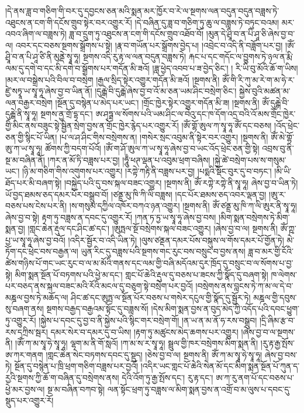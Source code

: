 །དེ་ནས་ཟླ་བ་གཅིག་གི་བར་དུ་དབྱངས་ཅན་མའི་སྨན་མར་ཁྱོར་བ་རེ་ལ་སྔགས་ལན་བདུན་བདུན་བཟླས་ཏེ་འཐུངས་ན་ངག་གི་དངོས་གྲུབ་སྟེར་བར་འགྱུར་རོ། །དེ་བཞིན་དུ་ཟླ་བ་གཅིག་ཏུ་ཆུ་ལ་བཟླས་ཏེ་བཏུང་བའམ། མར་འབའ་ཞིག་ལ་བཟླས་ཏེ། ཟླ་བ་དྲུག་ཏུ་འཐུངས་ན་ངག་གི་དངོས་གྲུབ་འཐོབ་བོ། །མུན་དེ་ཤྲཱི་བ་ན་པི་ཤཱ་ཅི་ཞེས་བྱ་བ་ལ། འབར་དང་བཅས་སྔགས་སྒྲོགས་པ་སྟེ། །རྣ་བ་གཡོན་པར་སྒྲོགས་བྱེད་པ། །འབྲེང་བ་འདི་ནི་བཟློག་པར་བྱ། །ཨོཾ་ཤྲཱི་བ་ན་པི་ཤཱ་ཙི་ནི་མུནྡེ་སྭཱ་ཧཱ། སྔགས་འདི་རུ་རྟ་ལ་ལན་བདུན་བཟླས་ཏེ། རྐང་པ་དང་གདོང་ལ་བྱུགས་ཏེ་ཉལ་ན་རྨི་ལམ་དུ་དགེ་བ་དང་མི་དགེ་བ་སྒྲོགས་པར་གདོན་མི་ཟའོ། །ཟླ་ཕྱེད་འབབ་པ་ཟ་བྱེད་ཅིང་། །
རི་ཡི་བུ་མོའི་ཆོ་ག་ཡིས། །མར་ལ་བསྒྲེས་པའི་བིལ་བ་བསྲེག །རྒྱལ་སྲིད་སྟེར་འགྱུར་གདོན་མི་ཟའོ། །སྔགས་ནི། ཨོཾ་གི་རི་ཀུ་མ་རེ་ག་མ་ཧེ་ར་ཛྱེ་སཏྭཱ་ཡ་སྭཱ་ཧཱ་ཞེས་བྱ་བ་ཡིན་ནོ། །དུརྒྒེ་བི་དུརྒྒེ་ཞེས་བྱ་བ་འོ་མ་ཅན་ཡམ་ཤིང་བསྲེག་ཅིང་། སྐྱེས་བུའི་མཚན་མ་ལན་བརྒྱར་བསྲེག །སྔོན་དུ་བསྙེན་པ་མེད་པར་ཡང་། །གྲོང་ཁྱེར་སྟེར་འགྱུར་གདོན་མི་ཟ། །སྔགས་ནི། ཨོཾ་དུརྒྒེ་བི་དུརྒྒེ་ནི་སྭཱ་ཧཱ། སྔགས་ནྱ་གྲོ་དྷ་དང་། ཨ་ཤྭཏྠ་ལ་སོགས་པའི་ཡམ་ཤིང་ལ་བེའུ་དང་ཁ་དོག་འདྲ་བའི་འོ་མས་གྲོང་ཁྱེར་གྱི་མིང་ནས་བཟུང་སྟེ་སྦྱིན་སྲེག་བྱས་ན་གྲོང་ཁྱེར་རྙེད་པར་འགྱུར་རོ། །ཨོཾ་གྷོ་ཨུལ་ཀ་སྭཱ་ཧཱ་ཨོཾ་དང་བཅས། །འོད་ཕྲེང་ཅན་གྱི་སྙིང་པོ་ཡིན། །པ་ལ་ཤ་ཤིང་གིས་བསྲེགས་ན། །གསེར་སྲང་འབུམ་ནི་སྟེར་བར་འགྱུར། །སྔགས་ནི། ཨོཾ་མེ་གྷོ་ཨུ་ཀ་ཡ་སྭཱ་ཧཱ། ཚོགས་ཀྱི་བདག་པོའོ། །ཨོཾ་ག་ཤོ་ཨུལ་ཀ་ཡ་སྭཱ་ཧཱ་ཞེས་བྱ་བ་ཡང་འོད་ཕྲེང་ཅན་གྱི་སྟེ། འབྲས་བུ་ནི་སྔ་མ་བཞིན་ནོ། །ཀར་ན་མོ་ཏི་བཟླས་པར་བྱ། །ཧཱུྃ་ཕཊ་ལྡན་པ་འབུམ་ཕྲག་བཞིས། །སྐྱེ་ཚེ་བསྲེག་པས་ས་གསུམ་ཡང་། །ཉི་མ་གཅིག་གིས་འགུགས་པར་འགྱུར། །རཀྟེ་ཀརྟི་ནི་བཟླས་པར་བྱ། །པདྨའི་སྡོང་བུར་དུ་བ་བཏང་། །མི་ཡི་ཐོད་པར་མི་བཞག་སྟེ། །བསྐྱེད་པའི་དུ་བས་སྐལ་བཟང་འགྱུར། །སྔགས་ནི། ཨོཾ་རཀྟེ་རཀྟེ་ནི་སྭཱ་ཧཱ། ཞེས་བྱ་བ་ཡིན་ཏེ། ཡོ་བྱད་ཐམས་ཅད་དམར་པོར་བསྒྲུབ་བོ། །ཙནྡྲ་མུ་ཁི་ཀི་ལི་བཟླས། །དང་པོར་ཐམས་ཅད་འབར་ལྡན་བྱ། །ཨུ་ར་བཅས་པས་ངེས་པར་ནི། །ས་གསུམ་དཀྱིལ་འཁོར་བཀའ་ཉན་འགྱུར། །སྔགས་ནི། ཨོཾ་ཙནྡྲ་མུ་ཁི་ཀ་ལི་ཨུར་ནི་སྭཱ་ཧཱ། ཞེས་བྱ་བ་སྟེ། རྟག་ཏུ་བཟླས་ན་དབང་དུ་འགྱུར་རོ། །ཀན་ཏ་ཏྱ་ཡ་སྭཱ་ཧཱ་ཞེས་བྱ་བས། །མིག་སྨན་བསྲེགས་ཏེ་མིག་སྨན་བྱ། །གླང་ཆེན་རྡུལ་དང་ཤིང་ཚ་དང་། །ཨུཏྤལ་སྔོ་བསྲེགས་སྐལ་བཟང་འགྱུར། །ཞེས་བྱ་བ་ལ། སྔགས་ནི། ཨོཾ་ཀྵ་པྱ་ཡ་སྭཱ་ཧཱ་ཞེས་བྱ་བའོ། །འདིར་སྦྱོར་བ་འདི་ཡིན་ཏེ། །ལུས་ཙནྡན་དམར་པོས་བསྐུས་ལ་གོས་དམར་པོ་གྱོན་ཏེ། མེ་ཏོག་དང་ཕྲེང་བས་བརྒྱན་ལ། ཡུན་རིང་དུ་བཟླས་པའི་སྔགས་གང་རུང་བས་བསྲུང་བ་བྱས་ནས། ཟླ་བ་མར་གྱི་ངོའི་ཚེས་གཉིས་པོ་གང་ཡང་རུང་བ་ལ་མ་མོའི་གནས་དང་ལམ་གྱི་བཞི་མདོའམ་དུར་ཁྲོད་དུ་བསྲུང་བ་ལ་སོགས་པ་བྱ་སྟེ། མིག་སྨན་སྔོན་པོ་བཏགས་པའི་ཕྱེ་མ་དང་། གླང་པོ་ཆེའི་རྡུལ་དུ་བཅས་པ་ཟངས་ཀྱི་སྣོད་དུ་བཞག་སྟེ། ཁ་ལེགས་པར་བཅད་ནས་སྐལ་བཟང་མའི་རོའི་མངལ་དུ་བཅུག་སྟེ་བསྲེག་པར་བྱའོ། །བསྲེགས་ནས་བླངས་ཏེ་ཀ་མ་ལ་དེ་བ་མཎྜལ་བྱས་ཏེ་མཆོད་ལ། ཤིང་ཚ་དང་ཨུཏྤ་ལ་སྔོན་པོར་བཅས་པ་གསེར་དངུལ་གྱི་སྣོད་དུ་སྦྱོར་ཏེ། མཎྜལ་གྱི་དབུས་སུ་བཞག་ནས། སྔགས་བརྒྱད་བརྒྱའམ་སྟོང་དུ་བཟླས་སོ། །དེས་མིག་སྨན་བྱས་ན་བུད་མེད་ཀྱི་འདོད་པའི་དབང་ཕྱུག་ཏུ་འགྱུར་རོ། །སྐྱེས་པ་དབང་དུ་བྱ་བ་ནི་སྐྱེས་པའི་སྙིང་གར་བསྲེག་གོ། །ན་ཡ་ན་མ་ནོ་ཧ་རས་བསྒྲུབ། །དྲི་ཞིམ་རྩ་བ་རས་དཀྲིས་སྦར། དམར་སེར་བ་དམར་དུ་བ་ཡིས། །རྟག་ཏུ་མཚུངས་མེད་ཆགས་པར་འགྱུར། །ཞེས་བྱ་བ་ལ་སྔགས་ནི། །ཨོཾ་ཀ་མ་སྭཱ་ཧེ་སྭཱ་ཧཱ། ལྷག་མ་ནི་གོ་སླའོ། །ཀ་མ་ས་ར་སྭཱ་ཧཱ། སྦྲུལ་གྱི་ཁར་བསྲེགས་མིག་སྨན་ནི། །རུ་རྟ་རྒྱ་སྤོས་ཨ་ཀར་གནག །གླང་ཆེན་སེང་བཏགས་དབང་དུ་སྡུད། །ཅེས་བྱ་བ་ལ། སྔགས་ནི། ཨོཾ་ཀ་མ་སྭཱ་ཧེ་སྭཱ་ཧཱ། ཞེས་བྱ་བས་ཏེ། སྔོན་དུ་བསྙེན་པ་ཁྲི་ཕྲག་གཅིག་བཟླས་པར་བྱའོ། །འདིར་ཡང་གླང་པོ་ཆེའི་སེན་མོ་དང་མིག་སྨན་སྔོན་པོ་ཀུན་ད་རྱའི་སྔགས་ཀྱི་ཆོ་ག་བཞིན་དུ་བསྲེགས་ནས། དེའི་འོག་ཏུ་རྒྱ་སྤོས་དང་། རུ་རྟ་དང་། ཨ་ཀ་རུ་ནག་པོ་དང་བཅས་པ་ཕྱེ་མར་བྱས་ལ། སྔ་མ་བཞིན་བཀབ་སྟེ། ལན་སྟོང་ཕྲག་ཏུ་བཟླས་ལ་མིག་སྨན་བྱས་ན་འགྲོ་བ་མ་ལུས་པ་དབང་དུ་སྡུད་པར་འགྱུར་རོ། 
